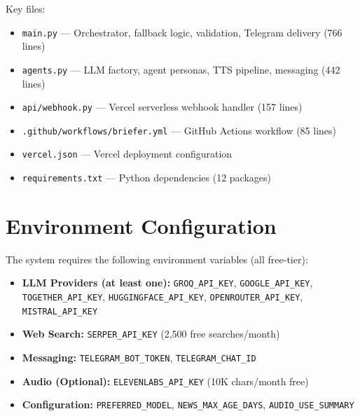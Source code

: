 \documentclass[12pt,a4paper]{report}
\begin{document}
\noindent Key files:
\begin{itemize}
    \item \texttt{main.py} --- Orchestrator, fallback logic, validation, Telegram delivery (766 lines)
    \item \texttt{agents.py} --- LLM factory, agent personas, TTS pipeline, messaging (442 lines)
    \item \texttt{api/webhook.py} --- Vercel serverless webhook handler (157 lines)
    \item \texttt{.github/workflows/briefer.yml} --- GitHub Actions workflow (85 lines)
    \item \texttt{vercel.json} --- Vercel deployment configuration
    \item \texttt{requirements.txt} --- Python dependencies (12 packages)
\end{itemize}

\chapter{Environment Configuration}
The system requires the following environment variables (all free-tier):
\begin{itemize}
    \item \textbf{LLM Providers (at least one):} \texttt{GROQ\_API\_KEY}, \texttt{GOOGLE\_API\_KEY}, \texttt{TOGETHER\_API\_KEY}, \texttt{HUGGINGFACE\_API\_KEY}, \texttt{OPENROUTER\_API\_KEY}, \texttt{MISTRAL\_API\_KEY}
    \item \textbf{Web Search:} \texttt{SERPER\_API\_KEY} (2,500 free searches/month)
    \item \textbf{Messaging:} \texttt{TELEGRAM\_BOT\_TOKEN}, \texttt{TELEGRAM\_CHAT\_ID}
    \item \textbf{Audio (Optional):} \texttt{ELEVENLABS\_API\_KEY} (10K chars/month free)
    \item \textbf{Configuration:} \texttt{PREFERRED\_MODEL}, \texttt{NEWS\_MAX\_AGE\_DAYS}, \texttt{AUDIO\_USE\_SUMMARY}
\end{itemize}
\end{document}
